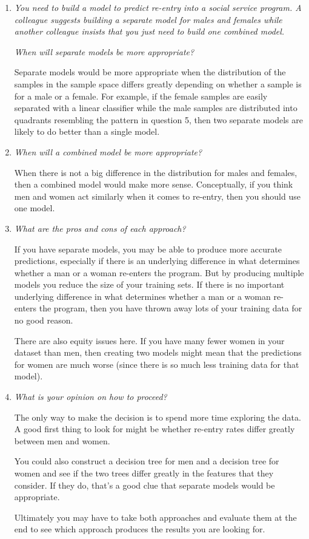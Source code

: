 \documentclass{article}
\begin{document}
\begin{enumerate}
    \item \textit{You need to build a model to predict re-entry into a social
        service program. A colleague suggests building a separate model for
        males and females while another colleague insists that you just need to
        build one combined model.}

        \textit{When will separate models be more appropriate?}

        Separate models would be more appropriate when the distribution of the
        samples in the sample space differs greatly depending on whether a
        sample is for a male or a female. For example, if the female samples
        are easily separated with a linear classifier while the male samples
        are distributed into quadrants resembling the pattern in question 5,
        then two separate models are likely to do better than a single model.

    \item \textit{When will a combined model be more appropriate?}

        When there is not a big difference in the distribution for males and
        females, then a combined model would make more sense. Conceptually, if
        you think men and women act similarly when it comes to re-entry, then
        you should use one model.

    \item \textit{What are the pros and cons of each approach?}

        If you have separate models, you may be able to produce more accurate
        predictions, especially if there is an underlying difference in what
        determines whether a man or a woman re-enters the program. But by
        producing multiple models you reduce the size of your training sets. If
        there is no important underlying difference in what determines whether
        a man or a woman re-enters the program, then you have thrown away lots
        of your training data for no good reason.

        There are also equity issues here. If you have many fewer women in your
        dataset than men, then creating two models might mean that the
        predictions for women are much worse (since there is so much less
        training data for that model).

    \item \textit{What is your opinion on how to proceed?}

        The only way to make the decision is to spend more time exploring the
        data. A good first thing to look for might be whether re-entry rates
        differ greatly between men and women.

        You could also construct a decision tree for men and a decision tree
        for women and see if the two trees differ greatly in the features that
        they consider. If they do, that's a good clue that separate models
        would be appropriate.

        Ultimately you may have to take both approaches and evaluate them at
        the end to see which approach produces the results you are looking for.
\end{enumerate}
\end{document}
